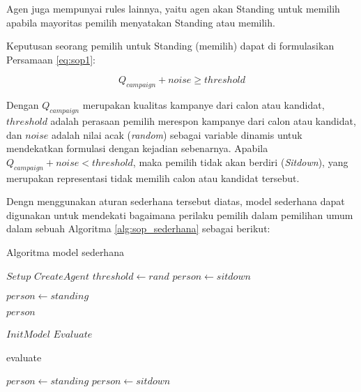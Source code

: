 Agen juga mempunyai rules lainnya, yaitu agen akan Standing untuk memilih apabila mayoritas pemilih menyatakan Standing atau memilih.

Keputusan seorang pemilih untuk Standing (memilih) dapat di formulasikan Persamaan \ref{eq:sop1}:

\begin{equation}
Q_{campaign} + noise \geqslant threshold
\label{eq:sop1}
\end{equation}

Dengan $Q_{campaign}$ merupakan kualitas kampanye dari calon atau kandidat, $threshold$ adalah perasaan pemilih merespon kampanye dari calon atau kandidat, dan $noise$ adalah nilai acak (\textit{random}) sebagai variable dinamis untuk mendekatkan formulasi dengan kejadian sebenarnya. Apabila $Q_{campaign} + noise < threshold$, maka pemilih tidak akan berdiri (\textit{Sitdown}), yang merupakan representasi tidak memilih calon atau kandidat tersebut.

Dengn menggunakan aturan sederhana tersebut diatas, model sederhana dapat digunakan untuk mendekati bagaimana perilaku pemilih dalam pemilihan umum dalam sebuah Algoritma \ref{alg:sop_sederhana} sebagai berikut:

\begin{algorithm}
\caption{Algoritma model sederhana}\label{alg:sop_sederhana}
	\begin{algorithmic}[1]
		\State $Setup$
		\State $CreateAgent$
		\State $threshold \longleftarrow rand$ 
		\State $person \longleftarrow sitdown$ 
	\EndProcedure

			\State $person \longleftarrow standing$ 
		\EndIf

		\Return $person$
	\EndProcedure

		\Require $InitModel$
		\Require $Evaluate$

			\State evaluate

				\State $person \longleftarrow standing$
			\Else
				\State $person \longleftarrow sitdown$
			\EndIf
		\EndFor\label{simplemodelforloop}
	\EndProcedure
	\end{algorithmic}
\end{algorithm}

